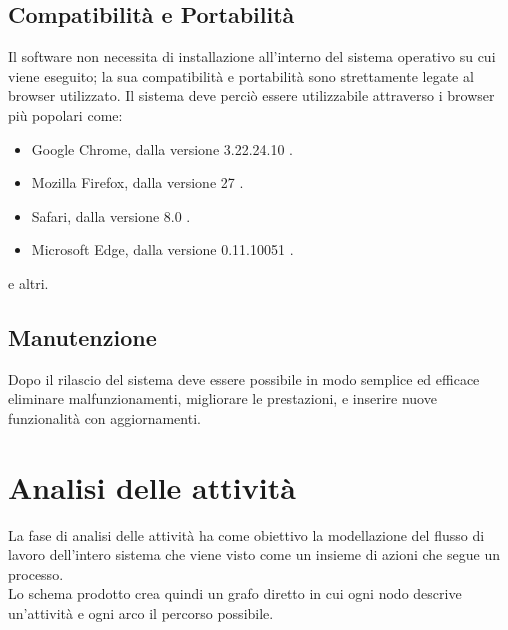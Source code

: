 \subsection{Compatibilità e Portabilità}
Il software non necessita di installazione all'interno del sistema operativo su cui viene eseguito; la sua compatibilità e portabilità sono strettamente legate al browser utilizzato. Il sistema deve perciò essere utilizzabile attraverso i browser più popolari \cite{browsers} come:
\begin{itemize}
  \item Google Chrome, dalla versione 3.22.24.10 \cite{chrome}.
  \item Mozilla Firefox, dalla versione 27 \cite{firefox}.
  \item Safari, dalla versione 8.0 \cite{safari}.
  \item Microsoft Edge, dalla versione 0.11.10051 \cite{edge}.
\end{itemize}
e altri.



\subsection{Manutenzione}
Dopo il rilascio del sistema deve essere possibile in modo semplice ed efficace eliminare malfunzionamenti, migliorare le prestazioni, e inserire nuove funzionalità con aggiornamenti.

\section{Analisi delle attività}
\label{sec:contesto}
La fase di analisi delle attività ha come obiettivo la modellazione del flusso di lavoro dell'intero sistema che viene visto come un insieme di azioni che segue un processo.\\
Lo schema prodotto crea quindi un grafo diretto in cui ogni nodo descrive un'attività e ogni arco il percorso possibile.  

